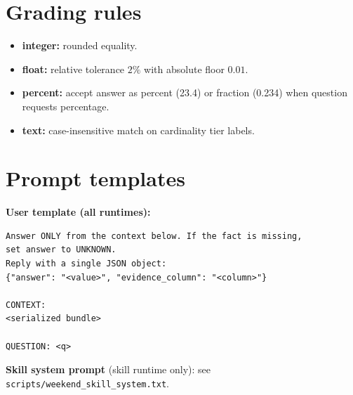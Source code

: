\documentclass[11pt,a4paper]{article}
\begin{document}
\section{Grading rules}
\label{app:grade}
\begin{itemize}[leftmargin=*]
  \item \textbf{integer:} rounded equality.
  \item \textbf{float:} relative tolerance $2\%$ with absolute floor $0.01$.
  \item \textbf{percent:} accept answer as percent (23.4) or fraction (0.234) when question requests percentage.
  \item \textbf{text:} case-insensitive match on cardinality tier labels.
\end{itemize}

\section{Prompt templates}
\label{app:prompts}
\textbf{User template (all runtimes):}
\begin{lstlisting}
Answer ONLY from the context below. If the fact is missing,
set answer to UNKNOWN.
Reply with a single JSON object:
{"answer": "<value>", "evidence_column": "<column>"}

CONTEXT:
<serialized bundle>

QUESTION: <q>
\end{lstlisting}

\textbf{Skill system prompt} (skill runtime only): see \texttt{scripts/weekend\_skill\_system.txt}.
\end{document}
